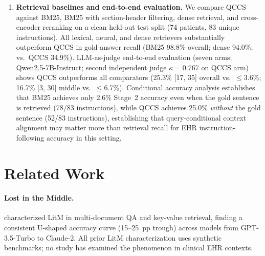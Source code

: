 \documentclass{article}
\begin{document}
\begin{enumerate}[leftmargin=*, topsep=2pt, itemsep=1pt]
  \item \textbf{Retrieval baselines and end-to-end evaluation.} We compare QCCS
  against BM25, BM25 with section-header filtering, dense retrieval, and cross-encoder
  reranking on a clean held-out test split (74 patients, 83 unique instructions).
  All lexical, neural, and dense retrievers substantially outperform QCCS in
  gold-answer recall (BM25 98.8\% overall; dense 94.0\%; vs.\ QCCS 34.9\%).
  LLM-as-judge end-to-end evaluation (seven arms; Qwen2.5-7B-Instruct; second
  independent judge $\kappa = 0.767$ on QCCS arm) shows QCCS outperforms all
  comparators (25.3\% [17, 35] overall vs.\ $\leq$3.6\%; 16.7\% [3, 30]
  middle vs.\ $\leq$6.7\%). Conditional accuracy analysis establishes that
  BM25 achieves only 2.6\% Stage~2 accuracy even when the gold sentence is
  retrieved (78/83 instructions), while QCCS achieves 25.0\% \emph{without}
  the gold sentence (52/83 instructions), establishing that
  query-conditional context alignment may matter more than retrieval
  recall for EHR instruction-following accuracy in this setting.
\end{enumerate}

\section{Related Work}
\label{sec:background}

\paragraph{Lost in the Middle.}
\citet{liu2024lost} characterized LitM in multi-document QA and key-value retrieval,
finding a consistent U-shaped accuracy curve (15--25~pp trough) across models from
GPT-3.5-Turbo to Claude-2. All prior LitM characterization uses synthetic benchmarks;
no study has examined the phenomenon in clinical EHR contexts.
\end{document}
